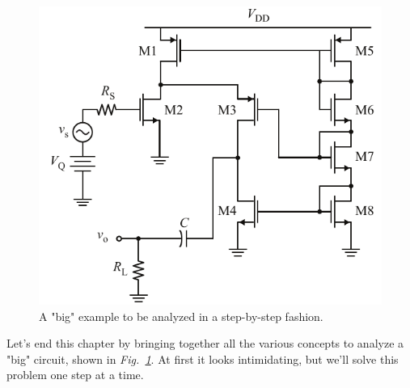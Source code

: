 \section{\topicE}
\begin{figure}[tb]
\centering
\includegraphics[scale=1]{16cascode_folded}
\caption{A "big" example to be analyzed in a step-by-step fashion.}
\label{fig:16cascode_folded}
\end{figure}
Let's end this chapter by bringing together all the various concepts to analyze a "big" circuit, shown in \emph{Fig.~\ref{fig:16cascode_folded}}.  At first it looks intimidating, but we'll solve this problem one step at a time.
